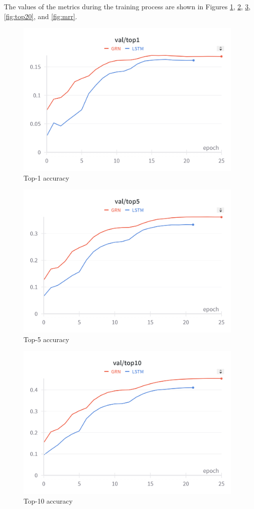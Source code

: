 \documentclass[twocolumn,twoside]{article}
\begin{document}
The values of the metrics during the training process are shown in Figures 
\ref{fig:top1}, \ref{fig:top5}, \ref{fig:top10}, \ref{fig:top20}, and \ref{fig:mrr}.
\begin{figure}[ht]
  \centering
  \includegraphics[width=\linewidth]{top1.png}
  \caption{Top-1 accuracy}
  \label{fig:top1}
\end{figure}
\begin{figure}[ht]
  \centering
  \includegraphics[width=\linewidth]{top5.png}
  \caption{Top-5 accuracy}
  \label{fig:top5}
\end{figure}
\begin{figure}[ht]
  \centering
  \includegraphics[width=\linewidth]{top10.png}
  \caption{Top-10 accuracy}
  \label{fig:top10}
\end{figure}
\end{document}
